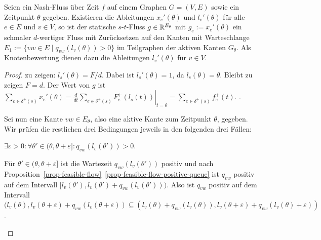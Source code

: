 \begin{theorem}
	Seien ein Nash-Fluss über Zeit $f$ auf einem Graphen $G=(V,E)$ sowie ein Zeitpunkt $\theta$ gegeben.	
	Existieren die Ableitungen $x_e'(\theta)$ und $l_v'(\theta)$ für alle $e\in E$ und $v\in V$, so ist der statische $s$-$t$-Fluss $g\in\mathbb{R}^{E_\theta}$ mit $g_e:=x_e'(\theta)$ ein schmaler $d$-wertiger Fluss mit Zurücksetzen auf den Kanten mit Warteschlange $E_1:=\{vw\in E \mid q_{vw}(l_v(\theta))>0 \}$ im Teilgraphen der aktiven Kanten $G_\theta$.
	Als Knotenbewertung dienen dazu die Ableitungen $l_v'(\theta)$ für $v\in V$.
\end{theorem}
\begin{proof}
	zu zeigen: $l_s'(\theta) = F/d$.
	Dabei ist $l_s'(\theta) = 1$, da $l_s(\theta) = \theta$. Bleibt zu zeigen $F= d$.
	Der Wert von $g$ ist $\sum_{e\in\delta^+(s)}x_e'(\theta) =  \left.\frac{d}{dt}\sum_{e\in\delta^+(s)}F_e^+(l_s(t))\right|_{t=\theta} = \sum_{e\in\delta^+(s)} f_e^+(t)$. .
		
	Sei nun eine Kante $vw\in E_\theta$, also eine aktive Kante zum Zeitpunkt $\theta$, gegeben. Wir prüfen die restlichen drei Bedingungen jeweils in den folgenden drei Fällen:
	
	\begin{description}[leftmargin=0cm, topsep=0cm, itemindent=\parindent]
		\item[1. Fall:] $\exists \varepsilon > 0:\forall \theta'\in (\theta, \theta + \varepsilon ] : q_{vw}(l_v(\theta')) > 0$.
		
		Für $\theta'\in(\theta,\theta+\varepsilon]$ ist die Wartezeit $q_{vw}(l_v(\theta'))$ positiv und nach Proposition~\ref{prop-feasible-flow}~\ref{prop-feasible-flow-positive-queue} ist $q_{vw}$ positiv auf dem Intervall $[ l_v(\theta')  , l_v(\theta')+q_{vw}(l_v(\theta')) )$.
		Also ist $q_{vw}$ positiv auf dem Intervall $( l_v(\theta) , l_v(\theta + \varepsilon) + q_{vw}(l_v(\theta + \varepsilon) )
		\subseteq ( l_v(\theta) + q_{vw}(l_v(\theta)) , l_v(\theta + \varepsilon) + q_{vw}(l_v(\theta) + \varepsilon ) )$.
		

\end{description}
\end{proof}
